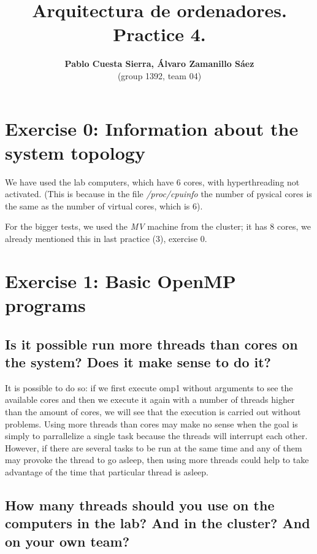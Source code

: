 \documentclass{article}
\newcommand{\question}[1]{\subsection{#1}}
\begin{document}
\title{\textbf{Arquitectura de ordenadores. Practice 4.}}
\author{\textbf{Pablo Cuesta Sierra, Álvaro Zamanillo Sáez}\\(group 1392, team 04)}
\maketitle

\begin{tcolorbox}
\tableofcontents
\end{tcolorbox}


\newpage
\section{Exercise 0: Information about the system topology}

We have used the lab computers, which have 6 cores, with hyperthreading not activated. (This is because in the file \emph{/proc/cpuinfo} the number of pysical cores is the same as the number of virtual cores, which is 6).

For the bigger tests, we used the \emph{MV} machine from the cluster; it has 8 cores, we already mentioned this in last practice (3), exercise 0.

\section{Exercise 1: Basic OpenMP programs}

\question{Is it possible run more threads than cores on the system? Does it make sense to do it?}

It is possible to do so: if we first execute omp1 without arguments to see the available cores and then we execute it again with a number of threads higher than the amount of cores, we will see that the execution is carried out without problems. Using more threads than cores may make no sense when the goal is simply to parrallelize a single task because the threads will interrupt each other. However, if there are several tasks to be run at the same time and any of them may provoke the thread to go asleep, then using more threads could help to take advantage of the time that particular thread is asleep. 


\question{How many threads should you use on the computers in the lab? And in the cluster? And on your own team?} 
\end{document}
